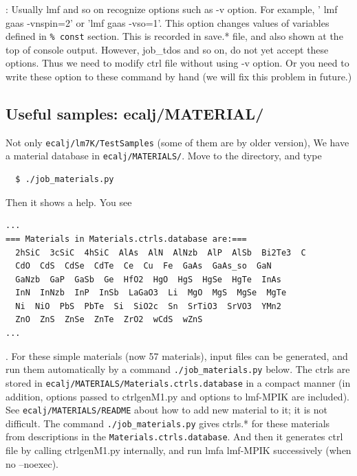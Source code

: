 \documentclass[a4paper,10pt,epsf,fleqn]{article}
\begin{document}
: 
Usually lmf and so on recognize options such as -v option. For example,
' lmf gaas -vnspin=2' or 'lmf gaas -vso=1'. 
This option changes values of variables defined in \verb+% const+ section.
This is recorded in save.* file, and also shown at the top of console output. 
However, job\_tdos and so on, do not yet accept these options.
Thus we need to modify ctrl file without using -v option.
Or you need to write these option to these command by hand
(we will fix this problem in future.)



\subsection{Useful samples: ecalj/MATERIAL/}
Not only \verb+ecalj/lm7K/TestSamples+ (some of them are by older version),
We have a material database in \verb+ecalj/MATERIALS/+. 
Move to the directory, and type  
\begin{verbatim}
  $ ./job_materials.py
\end{verbatim}
Then it shows a help. You see 
\begin{verbatim}
...
=== Materials in Materials.ctrls.database are:===
  2hSiC  3cSiC  4hSiC  AlAs  AlN  AlNzb  AlP  AlSb  Bi2Te3  C
  CdO  CdS  CdSe  CdTe  Ce  Cu  Fe  GaAs  GaAs_so  GaN
  GaNzb  GaP  GaSb  Ge  HfO2  HgO  HgS  HgSe  HgTe  InAs
  InN  InNzb  InP  InSb  LaGaO3  Li  MgO  MgS  MgSe  MgTe
  Ni  NiO  PbS  PbTe  Si  SiO2c  Sn  SrTiO3  SrVO3  YMn2
  ZnO  ZnS  ZnSe  ZnTe  ZrO2  wCdS  wZnS
...
\end{verbatim}
. For these simple materials (now 57 materials), input files can be generated,
and run them automatically by a command \verb+./job_materials.py+ below.
The ctrls are stored in \verb+ecalj/MATERIALS/Materials.ctrls.database+
in a compact manner
(in addition, options passed to ctrlgenM1.py and options to lmf-MPIK are
included). See \verb+ecalj/MATERIALS/README+ about how to add new
material to it; it is not difficult. 
The command \verb+./job_materials.py+ gives ctrls.* for these materials
from descriptions in the \verb+Materials.ctrls.database+.
And then it generates ctrl file by calling ctrlgenM1.py internally, 
and run lmfa lmf-MPIK successively (when no --noexec).
\end{document}

